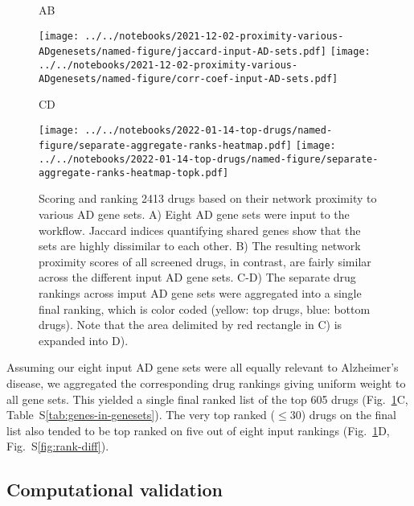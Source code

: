 \documentclass[letterpaper]{article}
\begin{document}
\begin{figure}
\hspace{0.05\textwidth}A\hspace{0.7\textwidth}B

\texttt{[image: ../../notebooks/2021-12-02-proximity-various-ADgenesets/named-figure/jaccard-input-AD-sets.pdf]}
\texttt{[image: ../../notebooks/2021-12-02-proximity-various-ADgenesets/named-figure/corr-coef-input-AD-sets.pdf]}

\hspace{0.05\textwidth}C\hspace{0.5\textwidth}D

\texttt{[image: ../../notebooks/2022-01-14-top-drugs/named-figure/separate-aggregate-ranks-heatmap.pdf]}
\texttt{[image: ../../notebooks/2022-01-14-top-drugs/named-figure/separate-aggregate-ranks-heatmap-topk.pdf]}

\caption{Scoring and ranking 2413 drugs based on their network proximity to
  various AD gene sets.  A) Eight AD gene sets were input to the workflow.
  Jaccard indices quantifying shared genes show that the sets are highly
  dissimilar to each other.  B) The resulting network proximity scores of all
  screened drugs, in contrast, are fairly similar across the different input
  AD gene sets.  C-D) The separate drug rankings across imput AD gene sets
  were aggregated into a single final ranking, which is color coded (yellow:
  top drugs, blue: bottom drugs).  Note that the area delimited by red
  rectangle in C) is expanded into D).
}
\label{fig:screen}
\end{figure}

Assuming our eight input AD gene sets were all equally relevant to Alzheimer's
disease, we aggregated the corresponding drug rankings giving uniform weight
to all gene sets.  This yielded a single final ranked list of the top 605
drugs (Fig.~\ref{fig:screen}C, Table~S\ref{tab:genes-in-genesets}).  The very top
ranked ($\le 30$) drugs on the final list also tended to be top ranked on five
out of eight input rankings (Fig.~\ref{fig:screen}D,
Fig.~S\ref{fig:rank-diff}).

\subsection{Computational validation}
\end{document}
